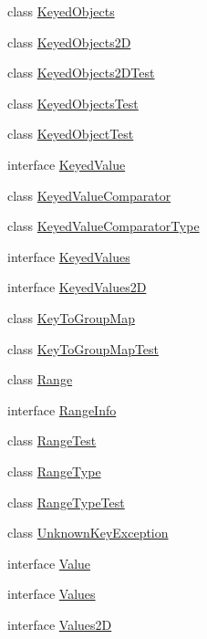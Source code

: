\begin{DoxyCompactItemize}
\item 
class \mbox{\hyperlink{classorg_1_1jfree_1_1data_1_1_keyed_objects}{Keyed\+Objects}}
\item 
class \mbox{\hyperlink{classorg_1_1jfree_1_1data_1_1_keyed_objects2_d}{Keyed\+Objects2D}}
\item 
class \mbox{\hyperlink{classorg_1_1jfree_1_1data_1_1_keyed_objects2_d_test}{Keyed\+Objects2\+D\+Test}}
\item 
class \mbox{\hyperlink{classorg_1_1jfree_1_1data_1_1_keyed_objects_test}{Keyed\+Objects\+Test}}
\item 
class \mbox{\hyperlink{classorg_1_1jfree_1_1data_1_1_keyed_object_test}{Keyed\+Object\+Test}}
\item 
interface \mbox{\hyperlink{interfaceorg_1_1jfree_1_1data_1_1_keyed_value}{Keyed\+Value}}
\item 
class \mbox{\hyperlink{classorg_1_1jfree_1_1data_1_1_keyed_value_comparator}{Keyed\+Value\+Comparator}}
\item 
class \mbox{\hyperlink{classorg_1_1jfree_1_1data_1_1_keyed_value_comparator_type}{Keyed\+Value\+Comparator\+Type}}
\item 
interface \mbox{\hyperlink{interfaceorg_1_1jfree_1_1data_1_1_keyed_values}{Keyed\+Values}}
\item 
interface \mbox{\hyperlink{interfaceorg_1_1jfree_1_1data_1_1_keyed_values2_d}{Keyed\+Values2D}}
\item 
class \mbox{\hyperlink{classorg_1_1jfree_1_1data_1_1_key_to_group_map}{Key\+To\+Group\+Map}}
\item 
class \mbox{\hyperlink{classorg_1_1jfree_1_1data_1_1_key_to_group_map_test}{Key\+To\+Group\+Map\+Test}}
\item 
class \mbox{\hyperlink{classorg_1_1jfree_1_1data_1_1_range}{Range}}
\item 
interface \mbox{\hyperlink{interfaceorg_1_1jfree_1_1data_1_1_range_info}{Range\+Info}}
\item 
class \mbox{\hyperlink{classorg_1_1jfree_1_1data_1_1_range_test}{Range\+Test}}
\item 
class \mbox{\hyperlink{classorg_1_1jfree_1_1data_1_1_range_type}{Range\+Type}}
\item 
class \mbox{\hyperlink{classorg_1_1jfree_1_1data_1_1_range_type_test}{Range\+Type\+Test}}
\item 
class \mbox{\hyperlink{classorg_1_1jfree_1_1data_1_1_unknown_key_exception}{Unknown\+Key\+Exception}}
\item 
interface \mbox{\hyperlink{interfaceorg_1_1jfree_1_1data_1_1_value}{Value}}
\item 
interface \mbox{\hyperlink{interfaceorg_1_1jfree_1_1data_1_1_values}{Values}}
\item 
interface \mbox{\hyperlink{interfaceorg_1_1jfree_1_1data_1_1_values2_d}{Values2D}}
\end{DoxyCompactItemize}

